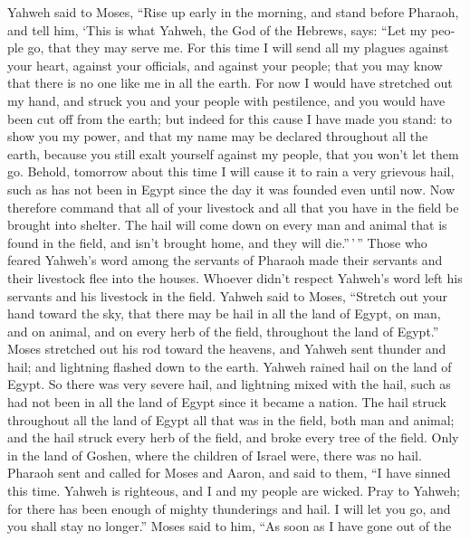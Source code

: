 \begin{paracol}{2}
\begin{otherlanguage}{english}
 Yahweh said to Moses, ``Rise up early in the morning,
and stand before Pharaoh, and tell him, `This is what Yahweh, the God of
the Hebrews, says: ``Let my people go, that they may serve me.
 For this time I will send all my plagues against your
heart, against your officials, and against your people; that you may
know that there is no one like me in all the earth.  For
now I would have stretched out my hand, and struck you and your people
with pestilence, and you would have been cut off from the earth;
 but indeed for this cause I have made you stand: to show
you my power, and that my name may be declared throughout all the earth,
 because you still exalt yourself against my people, that
you won't let them go.  Behold, tomorrow about this time
I will cause it to rain a very grievous hail, such as has not been in
Egypt since the day it was founded even until now.  Now
therefore command that all of your livestock and all that you have in
the field be brought into shelter. The hail will come down on every man
and animal that is found in the field, and isn't brought home, and they
will die.''\,'\,''  Those who feared Yahweh's word among
the servants of Pharaoh made their servants and their livestock flee
into the houses.  Whoever didn't respect Yahweh's word
left his servants and his livestock in the field.  Yahweh
said to Moses, ``Stretch out your hand toward the sky, that there may be
hail in all the land of Egypt, on man, and on animal, and on every herb
of the field, throughout the land of Egypt.''  Moses
stretched out his rod toward the heavens, and Yahweh sent thunder and
hail; and lightning flashed down to the earth. Yahweh rained hail on the
land of Egypt.  So there was very severe hail, and
lightning mixed with the hail, such as had not been in all the land of
Egypt since it became a nation.  The hail struck
throughout all the land of Egypt all that was in the field, both man and
animal; and the hail struck every herb of the field, and broke every
tree of the field.  Only in the land of Goshen, where the
children of Israel were, there was no hail.  Pharaoh sent
and called for Moses and Aaron, and said to them, ``I have sinned this
time. Yahweh is righteous, and I and my people are wicked.
 Pray to Yahweh; for there has been enough of mighty
thunderings and hail. I will let you go, and you shall stay no longer.''
 Moses said to him, ``As soon as I have gone out of the

\end{otherlanguage}
\end{paracol}
